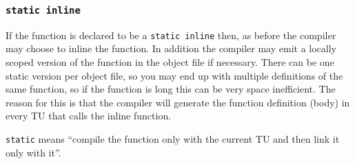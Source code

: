\documentclass[a4paper]{article}
\begin{document}
\subsubsection{\texttt{static inline}}

If the function is declared to be a \texttt{static inline} then, as before the compiler may choose to inline the function. In addition the compiler may emit a locally scoped version of the function in the object file if necessary. There can be one static version per object file, so you may end up with multiple definitions of the same function, so if the function is long this can be very space inefficient. The reason for this is that the compiler will generate the function definition (body) in every TU that calls the inline function. 
\begin{takeaway}
\textup{\texttt{static}} means ``compile the function only with the current TU and then link it only with it''.
\end{takeaway}
\end{document}
